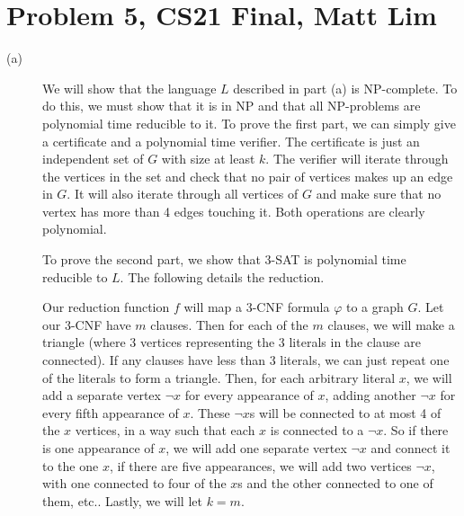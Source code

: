 \documentclass{article}
\begin{document}
\section*{Problem 5, CS21 Final, Matt Lim}
\begin{description}
    \item[(a)]
        We will show that the language $L$ described in part (a) is NP-complete.
        To do this, we must show that it is in NP and that all NP-problems are
        polynomial time reducible to it. To prove the first part, we can simply
        give a certificate and a polynomial time verifier. The certificate is
        just an independent set of $G$ with size at least $k$. The verifier will
        iterate through the vertices in the set and check that no pair of vertices
        makes up an edge in $G$. It will also iterate through all vertices
        of $G$ and make sure that no vertex has more than 4 edges touching it.
        Both operations are clearly polynomial.

        To prove the second part, we show that 3-SAT is polynomial time
        reducible to $L$. The following details the reduction.

        Our reduction function $f$ will map a 3-CNF formula $\varphi$ to a
        graph $G$. Let our 3-CNF have $m$ clauses. Then for each of the
        $m$ clauses, we will make a triangle (where 3 vertices representing
        the 3 literals in the clause are connected). If any clauses have
        less than 3 literals, we can just repeat one of the literals to
        form a triangle. Then, for each arbitrary literal $x$, we will
        add a separate vertex $\neg x$ for every appearance of $x$, adding
        another $\neg x$ for every fifth appearance of $x$.
        These $\neg x$s will be connected to at most 4 of the $x$ vertices, in
        a way such that each $x$ is connected to a $\neg x$.
        So if there is one appearance of $x$, we will add one separate vertex $\neg
        x$ and connect it to the one $x$, if there are five appearances, we will
        add two vertices $\neg x$, with one connected to four of the $x$s
        and the other connected to one of them, etc.. Lastly, we will let $k =
        m$.


\end{description}
\end{document}
